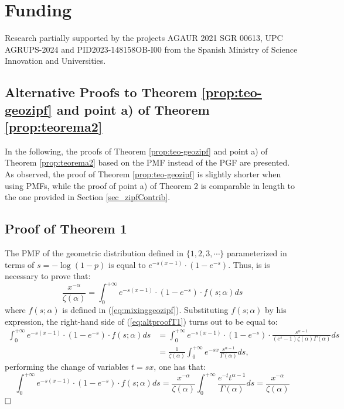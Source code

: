 \documentclass{article}
\begin{document}
\section*{Funding}
Research partially supported by the projects AGAUR 2021 SGR 00613, UPC AGRUPS-2024 and PID2023-148158OB-I00 from the Spanish Ministry of Science Innovation and Universities.

\begin{appendices}
\section{Alternative Proofs to Theorem \ref{prop:teo-geozipf} and point a) of Theorem \ref{prop:teorema2}}
\label{app_proof}

In the following, the proofs of Theorem \ref{prop:teo-geozipf} and point a) of Theorem \ref{prop:teorema2} based on the PMF instead of the PGF are presented. As observed, the proof  of Theorem \ref{prop:teo-geozipf} is slightly shorter when using PMFs, while the proof of point a) of Theorem 2 is comparable in length to the one provided in Section \ref{sec_zipfContrib}.

\subsection{Proof of Theorem 1}
The PMF of the geometric distribution defined in $\{1,2,3,\cdots \}$ parameterized in terms of $s=-\log(1-p)$ is equal to $e^{-s (x-1)} \cdot (1-e^{-s})$. Thus, is is necessary to prove that:
\begin{equation} \label{eq:altproofT1}
\frac{x^{-\alpha}}{\zeta(\alpha)}=\int_0^{+\infty} e^{-s (x-1)} \cdot (1-e^{-s}) \cdot f(s;\alpha) ds
\end{equation}
where $f(s;\alpha)$ is defined in (\ref{eq:mixinggeozipf}). Substituting $f(s;\alpha)$ by his expression, the right-hand side of  (\ref{eq:altproofT1}) turns out to be equal to:
\begin{align*}
\int_0^{+\infty} e^{-s (x-1)} \cdot (1-e^{-s}) \cdot f(s;\alpha) ds&=
\int_0^{+\infty} e^{-s (x-1)} \cdot (1-e^{-s}) \cdot \frac{s^{\alpha-1}}{(e^s-1) \zeta(\alpha) \Gamma(\alpha)} ds
\\&=
\frac{1}{\zeta(\alpha)} \int_0^{+\infty} e^{-s x} \frac{s^{\alpha-1}}{\Gamma(\alpha)} ds,
\end{align*}
performing the change of variables $t= s x$, one has that:
$$
\int_0^{+\infty} e^{-s (x-1)} \cdot (1-e^{-s}) \cdot f(s;\alpha) ds=\frac{x^{-\alpha}}{\zeta(\alpha)} \int_0^{+\infty} \frac{ e^{-t} t^{\alpha-1}}{\Gamma(\alpha)} ds =\frac{x^{-\alpha}}{\zeta(\alpha)}
$$
$\hfill{\square}$


\end{appendices}
\end{document}
